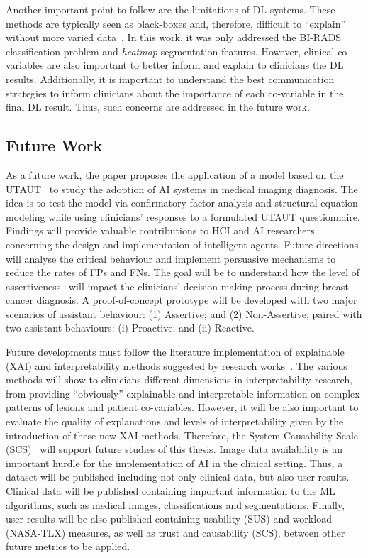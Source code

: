 Another important point to follow are the limitations of DL systems.
These methods are typically seen as black-boxes \cite{litjens2017survey} and, therefore, difficult to ``explain'' without more varied data~\cite{10.1145/3313831.3376290}.
In this work, it was only addressed the BI-RADS classification problem and {\it heatmap} segmentation features.
However, clinical co-variables are also important to better inform and explain to clinicians the DL results.
Additionally, it is important to understand the best communication strategies to inform clinicians about the importance of each co-variable in the final DL result.
Thus, such concerns are addressed in the future work.

\subsection{Future Work}

As a future work, the paper proposes the application of a model based on the UTAUT~\cite{venkatesh2016unified} to study the adoption of AI systems in medical imaging diagnosis.
The idea is to test the model via confirmatory factor analysis and structural equation modeling while using clinicians' responses to a formulated UTAUT questionnaire.
Findings will provide valuable contributions to HCI and AI researchers concerning the design and implementation of intelligent agents.
Future directions will analyse the critical behaviour and implement persuasive mechanisms to reduce the rates of FPs and FNs.
The goal will be to understand how the level of assertiveness~\cite{pacheco2019alignment, 10.1145/3311350.3347162} will impact the clinicians' decision-making process during breast cancer diagnosis.
A proof-of-concept prototype will be developed with two major scenarios of assistant behaviour:
(1) Assertive; and
(2) Non-Assertive;
paired with two assistant behaviours:
(i) Proactive; and
(ii) Reactive.

Future developments must follow the literature implementation of explainable (XAI) and interpretability methods suggested by research works~\cite{9233366}.
The various methods will show to clinicians different dimensions in interpretability research, from providing ``obviously'' explainable and interpretable information on complex patterns of lesions and patient co-variables.
However, it will be also important to evaluate the quality of explanations and levels of interpretability given by the introduction of these new XAI methods.
Therefore, the System Causability Scale (SCS)~\cite{andreas2020measuring} will support future studies of this thesis.
Image data availability is an important hurdle for the implementation of AI in the clinical setting.
Thus, a dataset will be published including not only clinical data, but also user results.
Clinical data will be published containing important information to the ML algorithms, such as medical images, classifications and segmentations.
Finally, user results will be also published containing usability (SUS) and workload (NASA-TLX) measures, as well as trust and causability (SCS), between other future metrics to be applied.